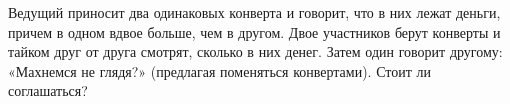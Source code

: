 \begin{comment}
\begin{problem}
Некто обладает одной облигацией, которую намеревается продать в один из последующих четырех дней, в которых цена облигации 
принимает различные значения, априори неизвестные, но становящиеся известными в начале каждого дня продаж. Предполагается, что 
цены облигации независимы и их перестановки по торговым дням равновозможны. Какова стратегия продавца, состоящая в выборе дня 
продажи облигации и гарантирующая максимальную вероятность того, что он продаст облигацию в день ее наибольшей цены? 
\end{problem}

\begin{ordre}
Рассмотреть следующие возможные стратегии и сравнить вероятности продажи облигации в день наибольшей цены: 
\begin{enumerate}
\item[а)] на первом шаге (в первый день торгов) запомним имевшую место цену облигации, не продавая ее, а затем продадим 
облигацию в тот день, когда ее цена окажется большей цены, зафиксированной в первый день, или (когда такого дня не окажется) в 
последний (четвертый) день, независимо от цены этого дня (стратегия $S_1$); 

\item[б)] не продавая облигацию в первом и втором торговых днях, зафиксируем  максимальную цену из двух, имевших место для этих дней, 
и продадим облигацию в третьем торговом дне, если цена облигации в нем будет выше, чем указанная зафиксированная максимальная цена, 
или, в противном случае, в четвертом дне (стратегия $S_2$). 
\end{enumerate}
\end{ordre}
\end{comment}

\begin{problem}
Ведущий приносит два одинаковых конверта и говорит, что в них лежат деньги, причем в одном вдвое больше, чем в другом. Двое участников берут конверты и тайком друг от друга смотрят, сколько в них денег. Затем один говорит другому: «Махнемся не глядя?» (предлагая поменяться конвертами). Стоит ли соглашаться?
\end{problem}

